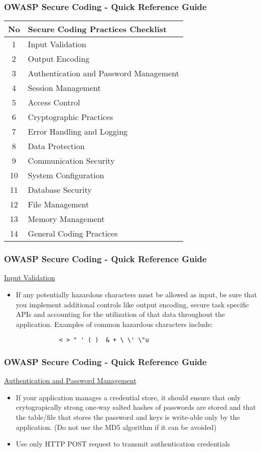 \documentclass[xcolor=pdftex,table,handouts]{beamer}
\begin{document}
\begin{frame}
	\frametitle{OWASP Secure Coding - Quick Reference Guide}
	\begin{center}
	\begin{tabular}{|c|l|}\hline
		No & Secure Coding Practices Checklist\\
		\hline
		1 & Input Validation \\
		2 & Output Encoding \\
		3 & Authentication and Password Management \\
		4 & Session Management \\
		5 & Access Control \\
		6 & Cryptographic Practices \\ 
		7 & Error Handling and Logging \\
		8 & Data Protection \\
		9 & Communication Security \\
		10 & System Configuration \\
		11 & Database Security \\
		12 & File Management \\
		13 & Memory Management \\
		14 & General Coding Practices \\
		\hline
	\end{tabular}
	\end{center}
\end{frame}

\begin{frame}[fragile]
	\frametitle{OWASP Secure Coding - Quick Reference Guide}
	\underline{Input Validation}
	\begin{itemize}
		\item If any potentially hazardous characters must be allowed as input, be sure that you implement additional controls like output encoding, secure task specific APIs and accounting for the utilization of that data throughout the application. Examples of common hazardous characters include: 
		\begin{verbatim} 
			< > " ' ( )  & + \ \' \"u
		\end{verbatim}
	\end{itemize}
\end{frame}

\begin{frame}
	\frametitle{OWASP Secure Coding - Quick Reference Guide}
	\underline{Authentication and Password Management} \\
	\begin{itemize}
	\item If your application manages a credential store, it should ensure that only crytograpically strong one-way salted hashes of passwords are stored and that the table/file that stores the password and keys is write-able only by the application. (Do not use the MD5 algorithm if it can be avoided)
	\item Use only HTTP POST request to transmit authentication credentials
	\end{itemize}
\end{frame}
\end{document}
